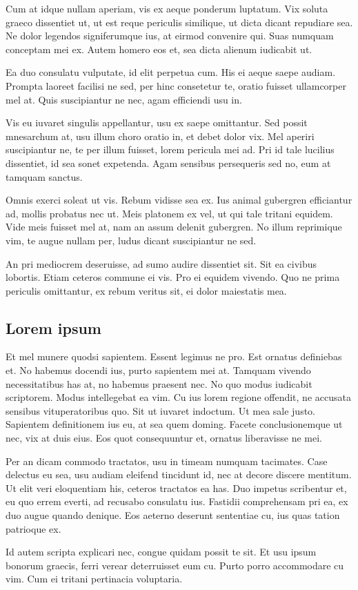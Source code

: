 Cum at idque nullam aperiam, vis ex aeque ponderum luptatum. Vix soluta graeco dissentiet ut, ut est reque periculis similique, ut dicta dicant repudiare sea. Ne dolor legendos signiferumque ius, at eirmod convenire qui. Suas numquam conceptam mei ex. Autem homero eos et, sea dicta alienum iudicabit ut.

Ea duo consulatu vulputate, id elit perpetua cum. His ei aeque saepe audiam. Prompta laoreet facilisi ne sed, per hinc consetetur te, oratio fuisset ullamcorper mel at. Quis suscipiantur ne nec, agam efficiendi usu in.

Vis eu iuvaret singulis appellantur, usu ex saepe omittantur. Sed possit mnesarchum at, usu illum choro oratio in, et debet dolor vix. Mel aperiri suscipiantur ne, te per illum fuisset, lorem pericula mei ad. Pri id tale lucilius dissentiet, id sea sonet expetenda. Agam sensibus persequeris sed no, eum at tamquam sanctus.

Omnis exerci soleat ut vis. Rebum vidisse sea ex. Ius animal gubergren efficiantur ad, mollis probatus nec ut. Meis platonem ex vel, ut qui tale tritani equidem. Vide meis fuisset mel at, nam an assum delenit gubergren. No illum reprimique vim, te augue nullam per, ludus dicant suscipiantur ne sed.

An pri mediocrem deseruisse, ad sumo audire dissentiet sit. Sit ea civibus lobortis. Etiam ceteros commune ei vis. Pro ei equidem vivendo. Quo ne prima periculis omittantur, ex rebum veritus sit, ei dolor maiestatis mea.

\subsection{Lorem ipsum}

Et mel munere quodsi sapientem. Essent legimus ne pro. Est ornatus definiebas et. No habemus docendi ius, purto sapientem mei at. Tamquam vivendo necessitatibus has at, no habemus praesent nec. No quo modus iudicabit scriptorem. Modus intellegebat ea vim. Cu ius lorem regione offendit, ne accusata sensibus vituperatoribus quo. Sit ut iuvaret indoctum. Ut mea sale justo. Sapientem definitionem ius eu, at sea quem doming. Facete conclusionemque ut nec, vix at duis eius. Eos quot consequuntur et, ornatus liberavisse ne mei.

Per an dicam commodo tractatos, usu in timeam numquam tacimates. Case delectus eu sea, usu audiam eleifend tincidunt id, nec at decore discere mentitum. Ut elit veri eloquentiam his, ceteros tractatos ea has. Duo impetus scribentur et, eu quo errem everti, ad recusabo consulatu ius. Fastidii comprehensam pri ea, ex duo augue quando denique. Eos aeterno deserunt sententiae cu, ius quas tation patrioque ex.

Id autem scripta explicari nec, congue quidam possit te sit. Et usu ipsum bonorum graecis, ferri verear deterruisset eum cu. Purto porro accommodare cu vim. Cum ei tritani pertinacia voluptaria.